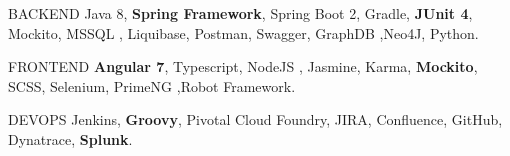 






\begin{cvskills}


\cvskill
{BACKEND} %
{Java 8, \textbf{Spring Framework}, Spring Boot 2, Gradle, \textbf{JUnit 4}, Mockito,  MSSQL , Liquibase, Postman, Swagger, GraphDB ,Neo4J, Python. } %


\cvskill
{FRONTEND} %
{\textbf{Angular 7}, Typescript, NodeJS , Jasmine, Karma, \textbf{Mockito}, SCSS, Selenium, PrimeNG ,Robot Framework.} %


\cvskill
{DEVOPS} %
{Jenkins, \textbf{Groovy}, Pivotal Cloud Foundry, JIRA, Confluence, GitHub, Dynatrace, \textbf{Splunk}.} %


\end{cvskills}